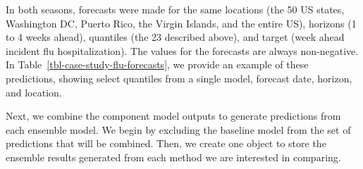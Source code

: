 \documentclass[
  letterpaper,
  DIV=11,
  numbers=noendperiod]{scrartcl}
\begin{document}
In both seasons, forecasts were made for the same locations (the 50 US
states, Washington DC, Puerto Rico, the Virgin Islands, and the entire
US), horizons (1 to 4 weeks ahead), quantiles (the 23 described above),
and target (week ahead incident flu hospitalization). The values for the
forecasts are always non-negative. In
Table~\ref{tbl-case-study-flu-forecasts}, we provide an example of these
predictions, showing select quantiles from a single model, forecast
date, horizon, and location.

Next, we combine the component model outputs to generate predictions
from each ensemble model. We begin by excluding the baseline model from
the set of predictions that will be combined. Then, we create one object
to store the ensemble results generated from each method we are
interested in comparing.
\end{document}
